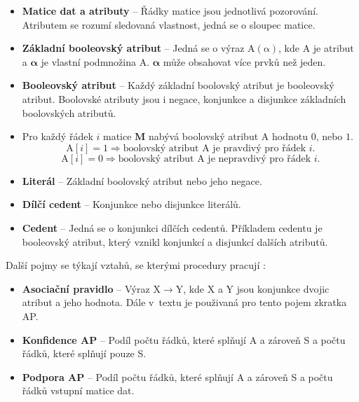 \begin{itemize}
    \itemsep0em
    \item \textbf{Matice dat a atributy} -- Řádky matice jsou jednotlivá pozorování. Atributem se rozumí sledovaná vlastnost, jedná se o sloupec matice.
    \item \textbf{Základní booleovský atribut} -- Jedná se o výraz $\bm{\mathrm{A(\alpha)}}$, kde $\bm{\mathrm{A}}$ je atribut a  $\bm{\alpha}$ je vlastní podmnožina $\bm{\mathrm{A}}$. $\bm{\alpha}$ může obsahovat více prvků než jeden.
    \item \textbf{Booleovský atribut} -- Každý základní boolovský atribut je booleovský atribut. Boolovské atributy jsou i negace, konjunkce a disjunkce základních boolovských atributů. 
    \item[] Pro každý řádek $i$ matice $\mathbf{M}$ nabývá boolovský atribut  $\bm{\mathrm{A}}$ hodnotu $0$, nebo $1$.
    \begin{equation*}
    \bm{\mathrm{A}}\left[i\right] = 1 \Rightarrow \mbox{boolovský atribut } \bm{\mathrm{A}} \mbox{ je pravdivý pro řádek } i.
    \end{equation*}
    \begin{equation*}
        \bm{\mathrm{A}}\left[i\right] = 0 \Rightarrow \mbox{boolovský atribut } \bm{\mathrm{A}} \mbox{ je nepravdivý pro řádek } i.
        \end{equation*}

    \item \textbf{Literál} -- Základní boolovský atribut nebo jeho negace.
    \item \textbf{Dílčí cedent} -- Konjunkce nebo disjunkce literálů.
    \item \textbf{Cedent} -- Jedná se o konjunkci dílčích cedentů. Příkladem cedentu je booleovský atribut, který vznikl konjunkcí a disjunkcí dalších atributů.

\end{itemize}


Další pojmy se týkají vztahů, se kterými procedury pracují \cite{bib:GUHA}:

\begin{itemize}
    \itemsep0em
    \item \textbf{Asociační pravidlo} -- Výraz $\mathrm{X} \rightarrow \mathrm{Y}$, kde $\mathrm{X}$ a $\mathrm{Y}$ jsou konjunkce dvojic atribut a jeho hodnota. Dále v~textu je použivaná pro tento pojem zkratka AP.
    \item \textbf{Konfidence AP} -- Podíl počtu řádků, které splňují A a zároveň S a počtu řádků, které splňují pouze S.
    \item \textbf{Podpora AP} -- Podíl počtu řádků, které splňují A a zároveň S a počtu řádků vstupní matice dat.
\end{itemize}

